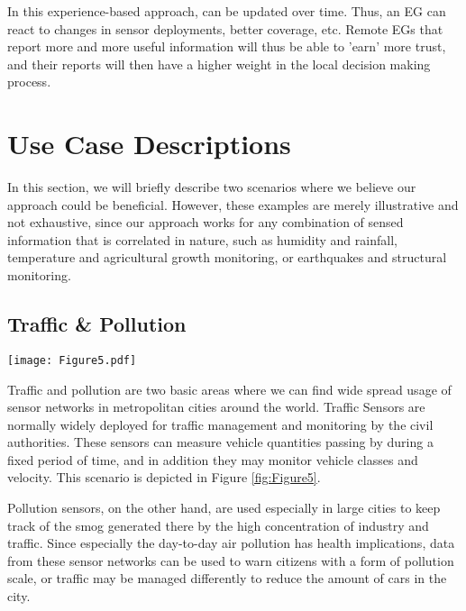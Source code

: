 \documentclass[onecolumn]{jaise2e}
\begin{document}
In this experience-based approach,  can be updated over time. Thus, an EG can react to changes in sensor deployments, better coverage, etc. Remote EGs that report more and more useful information will thus be able to 'earn' more trust, and their reports will then have a higher weight in the local decision making process.




\section{Use Case Descriptions}\label{sec:usecases}

In this section, we will briefly describe two scenarios where we believe our approach could be beneficial. However, these examples are merely illustrative and not exhaustive, since our approach works for any combination of sensed information that is correlated in nature, such as humidity and rainfall, temperature and agricultural growth monitoring, or earthquakes and structural monitoring.

\subsection{Traffic \& Pollution}

\begin{figure*}[t]
\centering
\texttt{[image: Figure5.pdf]} 
\caption{Traffic \& Pollution Scenario}
\label{fig:Figure5}
\end{figure*}


Traffic and pollution are two basic areas where we can find wide spread usage of sensor networks in metropolitan cities around the world. Traffic Sensors are normally widely deployed for traffic management and monitoring by the civil authorities. These sensors can measure vehicle quantities passing by during a fixed period of time, and in addition they may monitor vehicle classes and velocity. This scenario is depicted in Figure \ref{fig:Figure5}.

Pollution sensors, on the other hand, are used especially in large cities to keep track of the smog generated there by the high concentration of industry and traffic. Since especially the day-to-day air pollution has health implications, data from these sensor networks can be used to warn citizens with a form of pollution scale, or traffic may be managed differently to reduce the amount of cars in the city. 
\end{document}
